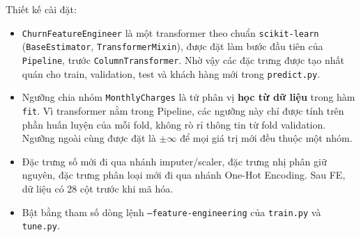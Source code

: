 Thiết kế cài đặt:
\begin{itemize}
    \item \texttt{ChurnFeatureEngineer} là một transformer theo chuẩn \texttt{scikit-learn} (\texttt{BaseEstimator}, \texttt{TransformerMixin}), được đặt làm bước đầu tiên của \texttt{Pipeline}, trước \texttt{ColumnTransformer}. Nhờ vậy các đặc trưng được tạo nhất quán cho train, validation, test và khách hàng mới trong \texttt{predict.py}.
    \item Ngưỡng chia nhóm \texttt{MonthlyCharges} là tứ phân vị \textbf{học từ dữ liệu} trong hàm \texttt{fit}. Vì transformer nằm trong Pipeline, các ngưỡng này chỉ được tính trên phần huấn luyện của mỗi fold, không rò rỉ thông tin từ fold validation. Ngưỡng ngoài cùng được đặt là $\pm\infty$ để mọi giá trị mới đều thuộc một nhóm.
    \item Đặc trưng số mới đi qua nhánh imputer/scaler, đặc trưng nhị phân giữ nguyên, đặc trưng phân loại mới đi qua nhánh One-Hot Encoding. Sau FE, dữ liệu có 28 cột trước khi mã hóa.
    \item Bật bằng tham số dòng lệnh \texttt{--feature-engineering} của \texttt{train.py} và \texttt{tune.py}.
\end{itemize}

